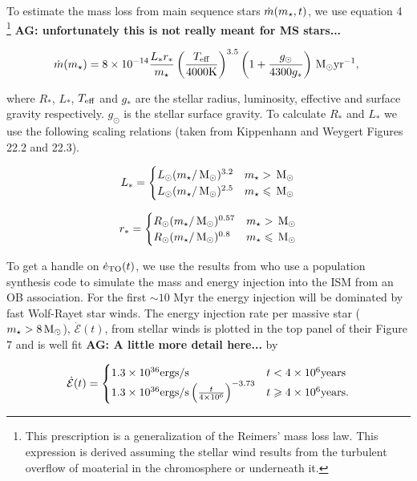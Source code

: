 To estimate the mass loss from main sequence stars
$\dot{m}(m_{\star}, t)$,
we use equation 4 \citet{SchroderCuntz:2005a}\footnote{This
  prescription is a generalization of the Reimers' mass loss law. This
expression is derived assuming the stellar wind results from the
turbulent overflow of moaterial in the chromosphere or underneath it.} {\bf AG:
  unfortunately this is not really meant for MS stars...}

\begin{align}
  \dot{m}(m_{\star})=8 \times 10^{-14} \frac{L_* r_*}{m_{\star}}
  \left(\frac{T_{\rm eff}}{\rm 4000 K}\right)^{3.5}
  \left(1+\frac{g_{\odot}}{4300 g_*}\right) \,{\rm M_\odot} {\rm yr}^{-1},\
\end{align}

where  $R_*$, $L_*$, $T_{\rm eff}$ and $g_*$ are the stellar radius,
luminosity, effective and surface gravity respectively. $g_{\odot}$ is
the stellar surface gravity. To calculate $R_*$ and $L_*$ we use the
following scaling relations (taken from Kippenhann and Weygert Figures
22.2 and 22.3).

\begin{align}
L_*=
\begin{cases}
L_{\odot} (m_{\star}/\,{\rm M_\odot})^{3.2} & m_{\star} > \,{\rm M_\odot} \\
L_{\odot} (m_{\star}/\,{\rm M_\odot})^{2.5} & m_{\star} \leqslant \,{\rm M_\odot}
\end{cases}
\end{align}

\begin{align}
r_*=
\begin{cases}
R_{\odot} (m_{\star}/\,{\rm M_\odot})^{0.57} & m_{\star} > \,{\rm M_\odot} \\
R_{\odot} (m_{\star}/\,{\rm M_\odot})^{0.8} & m_{\star} \leqslant \,{\rm M_\odot}
\end{cases}
\end{align}


To get a handle on $\dot{e}_{\rm TO}(t)$, we use the results from
\citet{VossDiehl+:2009a} who use a population synthesis code to
simulate the mass and energy injection into the ISM from an OB
association. For the first $\sim 10$ Myr the energy injection will
be dominated by fast Wolf-Rayet star winds. The energy injection rate
per massive star ($m_{\star}>8 \,{\rm M_\odot}$), $\dot{\mathcal{E}} (t)$, from
stellar winds is plotted in the top panel of their Figure 7 and is
well fit {\bf AG: A little more detail here...} by

\begin{align}
\dot{\mathcal{E}} (t)=
\begin{cases}
  1.3 \times 10^{36} {\rm ergs/s} & t<4 \times 10^6 {\rm years}\\
  1.3  \times 10^{36} {\rm ergs/s} \left(\frac{t}{4 \times  10^6}\right)^{-3.73} & t \ge 4 \times 10^6 {\rm years}.
\end{cases}
\label{eq:voss}
\end{align}

